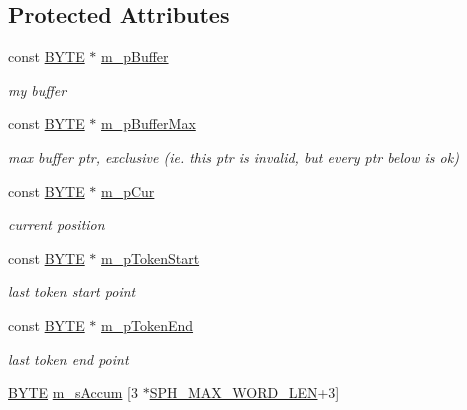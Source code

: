 \subsection*{Protected Attributes}
\begin{DoxyCompactItemize}
\item 
const \hyperlink{sphinxstd_8h_a4ae1dab0fb4b072a66584546209e7d58}{B\-Y\-T\-E} $\ast$ \hyperlink{classCSphTokenizerBase_ab83a78a7579ec2ee37468a811136cc5c}{m\-\_\-p\-Buffer}
\begin{DoxyCompactList}\small\item\em my buffer \end{DoxyCompactList}\item 
const \hyperlink{sphinxstd_8h_a4ae1dab0fb4b072a66584546209e7d58}{B\-Y\-T\-E} $\ast$ \hyperlink{classCSphTokenizerBase_aa9a5c4780fdf00aa11048e5c78f7ec6b}{m\-\_\-p\-Buffer\-Max}
\begin{DoxyCompactList}\small\item\em max buffer ptr, exclusive (ie. this ptr is invalid, but every ptr below is ok) \end{DoxyCompactList}\item 
const \hyperlink{sphinxstd_8h_a4ae1dab0fb4b072a66584546209e7d58}{B\-Y\-T\-E} $\ast$ \hyperlink{classCSphTokenizerBase_a337768e9d353bbc32c4ff2c36815148e}{m\-\_\-p\-Cur}
\begin{DoxyCompactList}\small\item\em current position \end{DoxyCompactList}\item 
const \hyperlink{sphinxstd_8h_a4ae1dab0fb4b072a66584546209e7d58}{B\-Y\-T\-E} $\ast$ \hyperlink{classCSphTokenizerBase_a990fc681be719877799ef7c7a884683c}{m\-\_\-p\-Token\-Start}
\begin{DoxyCompactList}\small\item\em last token start point \end{DoxyCompactList}\item 
const \hyperlink{sphinxstd_8h_a4ae1dab0fb4b072a66584546209e7d58}{B\-Y\-T\-E} $\ast$ \hyperlink{classCSphTokenizerBase_acaa50a8da4cf61d6adb7b9e139c6fba3}{m\-\_\-p\-Token\-End}
\begin{DoxyCompactList}\small\item\em last token end point \end{DoxyCompactList}\item 
\hyperlink{sphinxstd_8h_a4ae1dab0fb4b072a66584546209e7d58}{B\-Y\-T\-E} \hyperlink{classCSphTokenizerBase_a6a2d5d4ea7af5c0f4b70c10b24fe4f7a}{m\-\_\-s\-Accum} \mbox{[}3 $\ast$\hyperlink{sphinx_8h_ab0f6d383751adea7c80ed4ff4c36532c}{S\-P\-H\-\_\-\-M\-A\-X\-\_\-\-W\-O\-R\-D\-\_\-\-L\-E\-N}+3\mbox{]}

\end{DoxyCompactItemize}
